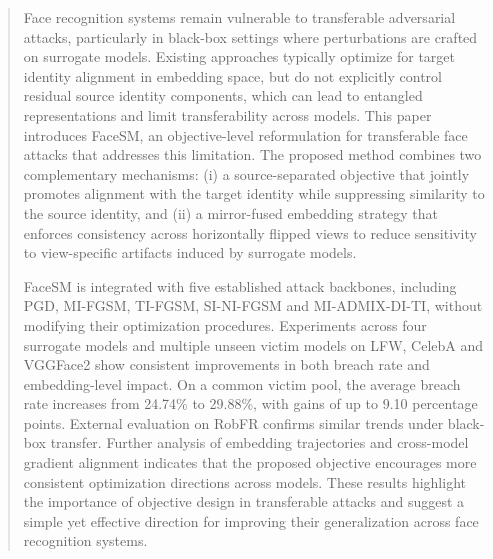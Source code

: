 \documentclass[a4paper,fleqn]{cas-dc}
\begin{document}



\begin{abstract}
Face recognition systems remain vulnerable to transferable adversarial attacks, particularly in black-box settings where perturbations are crafted on surrogate models. Existing approaches typically optimize for target identity alignment in embedding space, but do not explicitly control residual source identity components, which can lead to entangled representations and limit transferability across models. This paper introduces FaceSM, an objective-level reformulation for transferable face attacks that addresses this limitation. The proposed method combines two complementary mechanisms: (i) a source-separated objective that jointly promotes alignment with the target identity while suppressing similarity to the source identity, and (ii) a mirror-fused embedding strategy that enforces consistency across horizontally flipped views to reduce sensitivity to view-specific artifacts induced by surrogate models.

FaceSM is integrated with five established attack backbones, including PGD, MI-FGSM, TI-FGSM, SI-NI-FGSM and MI-ADMIX-DI-TI, without modifying their optimization procedures. Experiments across four surrogate models and multiple unseen victim models on LFW, CelebA and VGGFace2 show consistent improvements in both breach rate and embedding-level impact. On a common victim pool, the average breach rate increases from 24.74\% to 29.88\%, with gains of up to 9.10 percentage points. External evaluation on RobFR confirms similar trends under black-box transfer. Further analysis of embedding trajectories and cross-model gradient alignment indicates that the proposed objective encourages more consistent optimization directions across models. These results highlight the importance of objective design in transferable attacks and suggest a simple yet effective direction for improving their generalization across face recognition systems.
\end{abstract}


\end{document}
